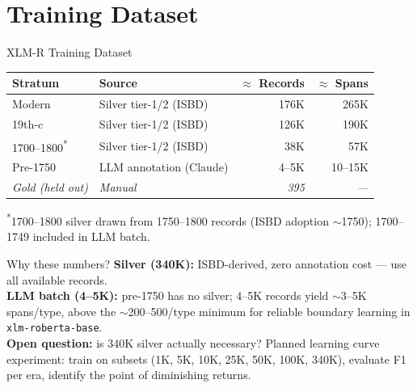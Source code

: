\documentclass[xcolor,aspectratio=169,compress]{beamer}
\begin{document}
\section{Training Dataset}

\begin{frame}{XLM-R Training Dataset}
  \small
  \begin{tabular}{llrr}
    \toprule
    Stratum & Source & $\approx$ Records & $\approx$ Spans \\
    \midrule
    Modern       & Silver tier-1/2 (ISBD) & 176K  & 265K    \\
    19th-c       & Silver tier-1/2 (ISBD) & 126K  & 190K    \\
    1700--1800\textsuperscript{*}
                 & Silver tier-1/2 (ISBD) &  38K  &  57K    \\
    Pre-1750     & LLM annotation (Claude) & 4--5K & 10--15K \\
    \midrule
    \textit{Gold (held out)} & \textit{Manual} & \textit{395} & \textit{---} \\
    \bottomrule
  \end{tabular}
  \par\vspace{2pt}
  \footnotesize\textsuperscript{*}1700--1800 silver drawn from 1750--1800 records (ISBD adoption $\sim$1750);
  1700--1749 included in LLM batch.
  \smallskip

  \begin{block}{Why these numbers?}
    \footnotesize
    \textbf{Silver (340K):} ISBD-derived, zero annotation cost --- use all available records.\\
    \textbf{LLM batch (4--5K):} pre-1750 has no silver; 4--5K records yield $\sim$3--5K spans/type,
    above the $\sim$200--500/type minimum for reliable boundary learning in \texttt{xlm-roberta-base}.\\
    \textbf{Open question:} is 340K silver actually necessary?
    Planned learning curve experiment: train on subsets (1K, 5K, 10K, 25K, 50K, 100K, 340K),
    evaluate F1 per era, identify the point of diminishing returns.
  \end{block}
\end{frame}
\end{document}
